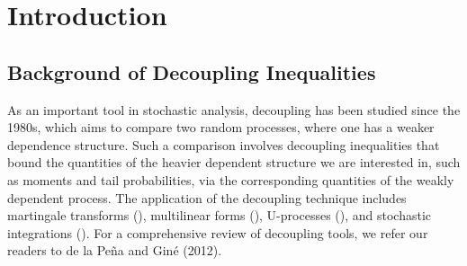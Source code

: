 \documentclass[ECP]{ejpecp} %
\begin{document}
\allowdisplaybreaks[1]





\section{Introduction}

\subsection{Background of Decoupling Inequalities}
As an important tool in stochastic analysis, decoupling has been studied since the 1980s, which aims to compare two random processes, where one has a weaker dependence structure. Such a comparison involves decoupling inequalities that bound the quantities of the heavier dependent structure we are interested in, such as moments and tail probabilities, via the corresponding quantities of the weakly dependent process. The application of the decoupling technique includes martingale transforms (\cite{burkholder1983geometric}), multilinear forms (\cite{mcconnell1986decoupling}), U-processes (\cite{de1992decoupling}), and stochastic integrations (\cite{kallenberg1989multiple,kwapien1991semimartingale,mcconnell1989decoupling}). For a comprehensive review of decoupling tools, we refer our readers to de la Pe\~na and Gin\'e \cite{de2012decoupling} (2012).
\end{document}
